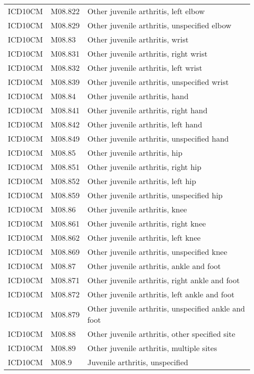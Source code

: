 \begin{table}[ht]
\begin{tabular}{lll}
  ICD10CM & M08.822 & Other juvenile arthritis, left elbow \\ 
  ICD10CM & M08.829 & Other juvenile arthritis, unspecified elbow \\ 
  ICD10CM & M08.83 & Other juvenile arthritis, wrist \\ 
  ICD10CM & M08.831 & Other juvenile arthritis, right wrist \\ 
  ICD10CM & M08.832 & Other juvenile arthritis, left wrist \\ 
  ICD10CM & M08.839 & Other juvenile arthritis, unspecified wrist \\ 
  ICD10CM & M08.84 & Other juvenile arthritis, hand \\ 
  ICD10CM & M08.841 & Other juvenile arthritis, right hand \\ 
  ICD10CM & M08.842 & Other juvenile arthritis, left hand \\ 
  ICD10CM & M08.849 & Other juvenile arthritis, unspecified hand \\ 
  ICD10CM & M08.85 & Other juvenile arthritis, hip \\ 
  ICD10CM & M08.851 & Other juvenile arthritis, right hip \\ 
  ICD10CM & M08.852 & Other juvenile arthritis, left hip \\ 
  ICD10CM & M08.859 & Other juvenile arthritis, unspecified hip \\ 
  ICD10CM & M08.86 & Other juvenile arthritis, knee \\ 
  ICD10CM & M08.861 & Other juvenile arthritis, right knee \\ 
  ICD10CM & M08.862 & Other juvenile arthritis, left knee \\ 
  ICD10CM & M08.869 & Other juvenile arthritis, unspecified knee \\ 
  ICD10CM & M08.87 & Other juvenile arthritis, ankle and foot \\ 
  ICD10CM & M08.871 & Other juvenile arthritis, right ankle and foot \\ 
  ICD10CM & M08.872 & Other juvenile arthritis, left ankle and foot \\ 
  ICD10CM & M08.879 & Other juvenile arthritis, unspecified ankle and foot \\ 
  ICD10CM & M08.88 & Other juvenile arthritis, other specified site \\ 
  ICD10CM & M08.89 & Other juvenile arthritis, multiple sites \\ 
  ICD10CM & M08.9 & Juvenile arthritis, unspecified \\ 

\end{tabular}
\end{table}
